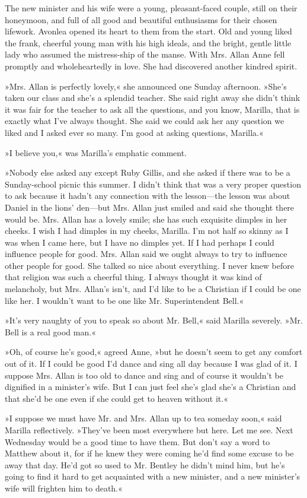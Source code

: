 The new minister and his wife were a young, pleasant-faced couple, still on their honeymoon, and full of all good and beautiful enthusiasms for their chosen lifework. Avonlea opened its heart to them from the start. Old and young liked the frank, cheerful young man with his high ideals, and the bright, gentle little lady who assumed the mistress-ship of the manse. With Mrs. Allan Anne fell promptly and wholeheartedly in love. She had discovered another kindred spirit.

»Mrs. Allan is perfectly lovely,« she announced one Sunday afternoon. »She’s taken our class and she’s a splendid teacher. She said right away she didn’t think it was fair for the teacher to ask all the questions, and you know, Marilla, that is exactly what I’ve always thought. She said we could ask her any question we liked and I asked ever so many. I’m good at asking questions, Marilla.«

»I believe you,« was Marilla’s emphatic comment.

»Nobody else asked any except Ruby Gillis, and she asked if there was to be a Sunday-school picnic this summer. I didn’t think that was a very proper question to ask because it hadn’t any connection with the lesson—the lesson was about Daniel in the lions’ den—but Mrs. Allan just smiled and said she thought there would be. Mrs. Allan has a lovely smile; she has such exquisite dimples in her cheeks. I wish I had dimples in my cheeks, Marilla. I’m not half so skinny as I was when I came here, but I have no dimples yet. If I had perhaps I could influence people for good. Mrs. Allan said we ought always to try to influence other people for good. She talked so nice about everything. I never knew before that religion was such a cheerful thing. I always thought it was kind of melancholy, but Mrs. Allan’s isn’t, and I’d like to be a Christian if I could be one like her. I wouldn’t want to be one like Mr. Superintendent Bell.«

»It’s very naughty of you to speak so about Mr. Bell,« said Marilla severely. »Mr. Bell is a real good man.«

»Oh, of course he’s good,« agreed Anne, »but he doesn’t seem to get any comfort out of it. If I could be good I’d dance and sing all day because I was glad of it. I suppose Mrs. Allan is too old to dance and sing and of course it wouldn’t be dignified in a minister’s wife. But I can just feel she’s glad she’s a Christian and that she’d be one even if she could get to heaven without it.«

»I suppose we must have Mr. and Mrs. Allan up to tea someday soon,« said Marilla reflectively. »They’ve been most everywhere but here. Let me see. Next Wednesday would be a good time to have them. But don’t say a word to Matthew about it, for if he knew they were coming he’d find some excuse to be away that day. He’d got so used to Mr. Bentley he didn’t mind him, but he’s going to find it hard to get acquainted with a new minister, and a new minister’s wife will frighten him to death.«

